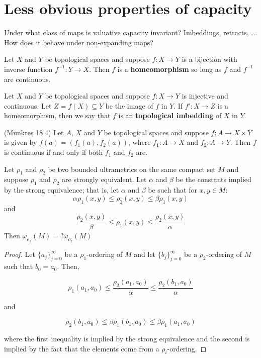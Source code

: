 
\newpage
\section*{Less obvious properties of capacity}
Under what class of maps is valuative capacity invariant? Imbeddings, retracts, ... How does it behave under non-expanding maps?
\begin{definition*}
Let $X$ and $Y$ be topological spaces and suppose $f: X \rightarrow Y$ is a bijection with inverse function $f^{-1}: Y \rightarrow X$. Then $f$ is a \textbf{homeomorphism} so long as $f$ and $f^{-1}$ are continuous.
\end{definition*}

\begin{definition*}
Let $X$ and $Y$ be topological spaces and suppose $f: X \rightarrow Y$ is injective and continuous. Let $Z =f(X) \subseteq Y$ be the image of $f$ in $Y$. If $f': X \rightarrow Z$ is a homeomorphism, then we say that $f$ is an \textbf{topological imbedding} of $X$ in $Y$.
\end{definition*}

\begin{proposition*} (Munkres 18.4)
Let $A$, $X$ and $Y$ be topological spaces and suppose $f: A \rightarrow X \times Y$  is given by $f(a) = (f_1(a), f_2(a))$, where $f_1:A \rightarrow X$ and $f_2:A \rightarrow Y$. Then $f$ is continuous if and only if both $f_1$ and $f_2$ are.  
\end{proposition*}

\newpage
\begin{proposition*}
Let $\rho_1$ and $\rho_2$ be two bounded ultrametrics on the same compact set $M$ and suppose $\rho_1$ and $\rho_2$ are strongly equivalent. Let $\alpha$ and $\beta$ be the constants implied by the strong equivalence; that is, let  $\alpha$ and $\beta$ be such that for $x,y \in M$:
\[\alpha \rho_1(x,y) \leq \rho_2(x,y) \leq \beta\rho_1(x,y)\]
and
\[\frac{\rho_2(x,y)}{\beta}  \leq \rho_1(x,y) \leq \frac{\rho_2(x,y)}{\alpha} \]
 Then $\omega_{\rho_1}(M) = ? \omega_{\rho_2}(M)$
\end{proposition*}

\begin{proof}
Let $\{a_j\}_{j=0}^\infty$ be a  $\rho_1$-ordering of $M$ and let $\{b_j\}_{j=0}^\infty$ be a $\rho_2$-ordering of $M$ such that $b_0=a_0$. Then,

\[\rho_1(a_1,a_0) \leq  \frac{\rho_2(a_1,a_0)}{\alpha} \leq  \frac{\rho_2(b_1,a_0)}{\alpha}\]

and 

\[\rho_2(b_1,a_0) \leq  \beta\rho_1(b_1,a_0) \leq  \beta\rho_1(a_1,a_0)\]

where the first inequality is implied by the strong equivalence and the second is implied by the fact that the elements come from a $\rho_i$-ordering.

\end{proof}


